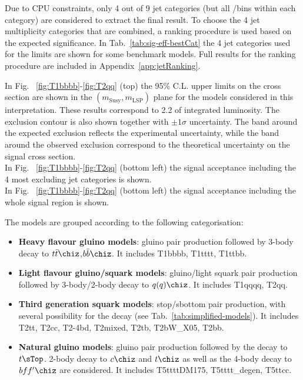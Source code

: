 Due to CPU constraints, only 4 out of 9 jet categories (but all \nb/\scalht bins
within each category) are considered to extract the final result. 
To choose the 4 jet multiplicity categories that are combined, a ranking procedure 
is used based on the expected significance. 
In Tab.~\ref{tab:sig-eff-bestCat} the 4 jet categories used for the limits are shown for some benchmark models. 
Full results for the ranking procedure are included in Appendix~\ref{app:jetRanking}. 

In Fig. ~\ref{fig:T1bbbb}-\ref{fig:T2qq} (top) the 95\% C.L. upper limits on the cross section are shown 
in the $(m_{\mathrm{Susy}},m_{\mathrm{LSP}})$ plane for the models considered in this interpretation. 
These results correspond to 2.2 \ifb of integrated luminosity. 
The exclusion contour is also shown together with $\pm1\sigma$ uncertainty. 
The band around the expected exclusion reflects the experimental uncertainty, 
while the band around the observed exclusion correspond to the theoretical 
uncertainty on the signal cross section.\\
In Fig. ~\ref{fig:T1bbbb}-\ref{fig:T2qq} (bottom left) the signal acceptance 
including the 4 most excluding jet categories is shown. \\
In Fig. ~\ref{fig:T1bbbb}-\ref{fig:T2qq} (bottom left) the signal acceptance 
including the whole signal region is shown.

The models are grouped according to the following categorisation:
\begin{itemize}
\item \textbf{Heavy flavour gluino models}: gluino pair production followed by 3-body decay to $t\bar{t}\chiz$,$b\bar{b}\chiz$. 
  It includes T1bbbb, T1tttt, T1ttbb. 
\item \textbf{Light flavour gluino/squark models}: gluino/light squark pair production followed by 3-body/2-body decay to $q(q)\chiz$. 
  It includes T1qqqq, T2qq. 
\item \textbf{Third generation squark models}: stop/sbottom pair production, with several possibility for the decay (see Tab.~\ref{tab:simplified-models}). 
  It includes T2tt, T2cc, T2-4bd, T2mixed, T2tb, T2bW\_X05, T2bb. 
\item \textbf{Natural gluino models}: gluino pair production followed by the decay to $t\sTop$. 2-body decay to $c\chiz$ and $t\chiz$ as well as  
  the 4-body decay to $bff'\chiz$ are considered. It includes T5ttttDM175, T5tttt\_degen, T5ttcc. 
\end{itemize} 

